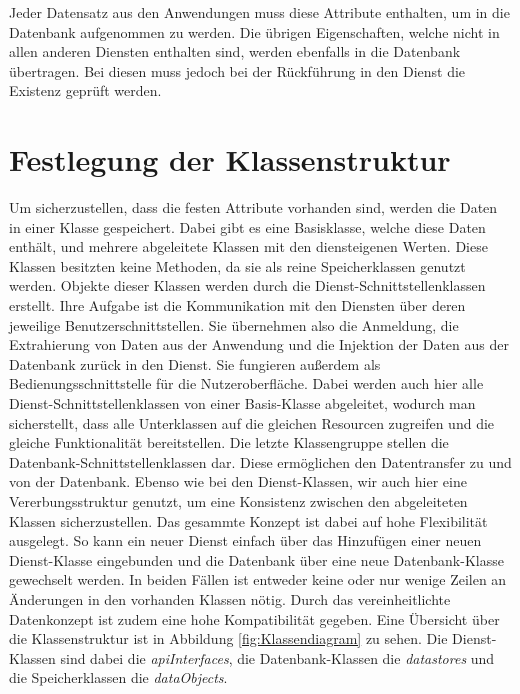 Jeder Datensatz aus den Anwendungen muss diese Attribute enthalten, um in die Datenbank aufgenommen zu werden. Die übrigen Eigenschaften, welche nicht in allen anderen Diensten enthalten sind, werden ebenfalls in die Datenbank übertragen. Bei diesen muss jedoch bei der Rückführung in den Dienst die Existenz geprüft werden. \\

\section{Festlegung der Klassenstruktur}

Um sicherzustellen, dass die festen Attribute vorhanden sind, werden die Daten in einer Klasse gespeichert. Dabei gibt es eine Basisklasse, welche diese Daten enthält, und mehrere abgeleitete Klassen mit den diensteigenen Werten. Diese Klassen besitzten keine Methoden, da sie als reine Speicherklassen genutzt werden. Objekte dieser Klassen werden durch die Dienst-Schnittstellenklassen erstellt. Ihre Aufgabe ist die Kommunikation mit den Diensten über deren jeweilige Benutzerschnittstellen. Sie übernehmen also die Anmeldung, die Extrahierung von Daten aus der Anwendung und die Injektion der Daten aus der Datenbank zurück in den Dienst. Sie fungieren außerdem als Bedienungsschnittstelle für die Nutzeroberfläche. Dabei werden auch hier alle Dienst-Schnittstellenklassen von einer Basis-Klasse abgeleitet, wodurch man sicherstellt, dass alle Unterklassen auf die gleichen Resourcen zugreifen und die gleiche Funktionalität bereitstellen. Die letzte Klassengruppe stellen die Datenbank-Schnittstellenklassen dar. Diese ermöglichen den Datentransfer zu und von der Datenbank. Ebenso wie bei den Dienst-Klassen, wir auch hier eine Vererbungsstruktur genutzt, um eine Konsistenz zwischen den abgeleiteten Klassen sicherzustellen. Das gesammte Konzept ist dabei auf hohe Flexibilität ausgelegt. So kann ein neuer Dienst einfach über das Hinzufügen einer neuen Dienst-Klasse eingebunden und die Datenbank über eine neue Datenbank-Klasse gewechselt werden. In beiden Fällen ist entweder keine oder nur wenige Zeilen an Änderungen in den vorhanden Klassen nötig. Durch das vereinheitlichte Datenkonzept ist zudem eine hohe Kompatibilität gegeben. Eine Übersicht über die Klassenstruktur ist in Abbildung \ref{fig:Klassendiagram} zu sehen. Die Dienst-Klassen sind dabei die \textit{apiInterfaces}, die Datenbank-Klassen die \textit{datastores} und die Speicherklassen die \textit{dataObjects}.\\


